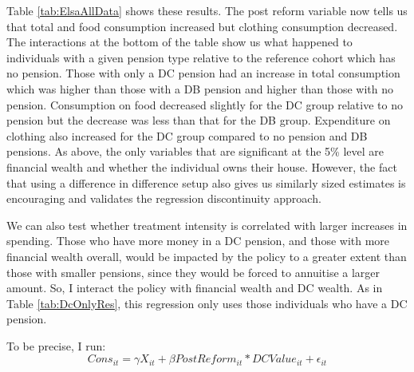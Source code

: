 \documentclass[12pt]{article}
\begin{document}
Table \ref{tab:ElsaAllData} shows these results. The post reform variable now
tells us that total and food consumption increased but clothing consumption
decreased. The interactions at the bottom of the table show us what happened to
individuals with a given pension type relative to the reference cohort which has
no pension. Those with only a DC pension had an increase in total consumption
which was higher than those with a DB pension and higher than those with no
pension. Consumption on food decreased slightly for the DC group relative to no
pension but the decrease was less than that for the DB group. Expenditure on
clothing also increased for the DC group compared to no pension and DB pensions.
As above, the only variables that are significant at the 5\% level are financial
wealth and whether the individual owns their house. However, the fact that using
a difference in difference setup also gives us similarly sized estimates is
encouraging and validates the regression discontinuity approach.

We can also test whether treatment intensity is correlated with larger increases
in spending. Those who have more money in a DC pension, and those with more
financial wealth overall, would be impacted by the policy to a greater extent
than those with smaller pensions, since they would be forced to annuitise a
larger amount. So, I interact the policy with financial wealth and DC wealth. As
in Table \ref{tab:DcOnlyRes}, this regression only uses those individuals who
have a DC pension.

To be precise, I run:
\begin{equation*}
    Cons_{it} =  \gamma X_{it} + \beta PostReform_{it}*DCValue_{it} + \epsilon_{it}
\end{equation*}


\begin{landscape}
    \linespread{1}

    
\end{landscape}

\begin{landscape}
    \linespread{1}

    
\end{landscape}

\begin{landscape}
    \linespread{1}

    
\end{landscape}
\end{document}
